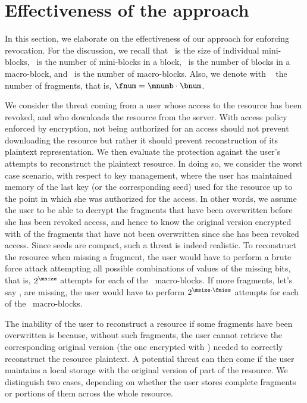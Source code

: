 \section{Effectiveness of the approach}\label{ms:sec:security}

In this section, we elaborate on the effectiveness of our approach for enforcing revocation. For the discussion, we recall that \msize\ is the size of individual mini-blocks, \mnumb\ is the number of mini-blocks in a block, \bnum\ is the number of blocks in a macro-block, and \Mnum\ is the number of macro-blocks. Also, we denote with \fnum\ \! the number of fragments, that is, $\fnum=\mnumb \cdot \bnum$.

We consider the threat coming from a user whose access to the resource has been revoked, and who downloads the resource from the server. With access policy enforced by encryption, not being authorized for an access should not prevent downloading the resource but rather it should prevent reconstruction of its plaintext representation. We then evaluate the protection against the user's attempts to reconstruct the plaintext resource. In doing so, we consider the worst case scenario, with respect to key management, where the user has maintained memory of the last key (or the corresponding seed) used for the resource up to the point in which she was authorized for the access. In other words, we assume the user to be able to decrypt the fragments that have been overwritten before she has been revoked access, and hence to know the original version encrypted with  of the fragments that have not been overwritten since she has been revoked access. Since seeds are compact, such a threat is indeed realistic. To reconstruct the resource when missing a fragment, the user would have to perform a brute force attack attempting all possible combinations of values of the missing bits, that is, $2^{\tiny\msize}$ attempts for each of the \Mnum\ macro-blocks. If more fragments, let's say \fmiss, are missing, the user would have to perform $2^{\tiny{\msize}\cdot \fmiss}$ attempts for each of the \Mnum\ macro-blocks. 

The inability of the user to reconstruct a resource if some fragments have been overwritten is because, without such fragments, the user cannot retrieve the corresponding original version (the one encrypted with ) needed to correctly reconstruct the resource plaintext. A potential threat can then come if the user maintains a local storage with the original version of part of the resource. We distinguish two cases, depending on whether the user stores complete fragments or portions of them across the whole resource.

